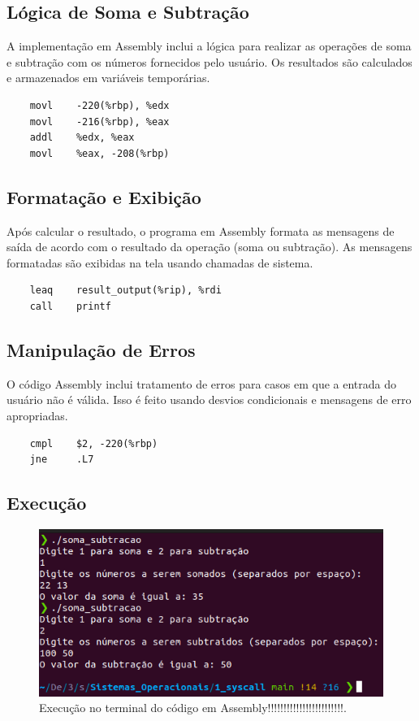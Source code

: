 \documentclass[
	12pt,				%
	openright,			%
	oneside,			%
	a4paper,			%
	chapter=TITLE,		%
	english,			%
	french,				%
	spanish,			%
	brazil				%
	]{abntex2}
\theoremstyle{definition}
\begin{document}
\subsection{Lógica de Soma e Subtração}

A implementação em Assembly inclui a lógica para realizar as operações de soma e 
subtração com os números fornecidos pelo usuário. Os resultados são calculados e 
armazenados em variáveis temporárias.

\begin{verbatim}
    movl    -220(%rbp), %edx
    movl    -216(%rbp), %eax
    addl    %edx, %eax
    movl    %eax, -208(%rbp)
\end{verbatim}

\subsection{Formatação e Exibição}

Após calcular o resultado, o programa em Assembly formata as mensagens de saída de acordo 
com o resultado da operação (soma ou subtração). As mensagens formatadas são exibidas na 
tela usando chamadas de sistema.

\begin{verbatim}
    leaq    result_output(%rip), %rdi
    call    printf
\end{verbatim}

\subsection{Manipulação de Erros}

O código Assembly inclui tratamento de erros para casos em que a entrada do usuário não é 
válida. Isso é feito usando desvios condicionais e mensagens de erro apropriadas.

\begin{verbatim}
    cmpl    $2, -220(%rbp)
    jne     .L7
\end{verbatim}

\subsection{Execução}

\begin{figure} %
    \centering
    \includegraphics[width=1.0\textwidth]{imagens/run_asm.png}
	\caption{Execução no terminal do código em Assembly!!!!!!!!!!!!!!!!!!!!!!!!.}
	\label{fig:run_asm}
\end{figure}
\end{document}
